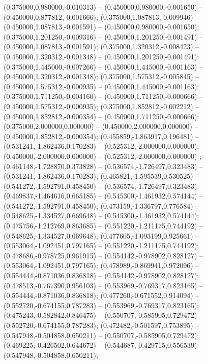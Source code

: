  (0.375000,0.980000,-0.010313) -- (0.450000,0.980000,-0.001650) -- (0.450000,0.877812,-0.001666);
 (0.375000,1.087813,-0.009946) -- (0.450000,1.087813,-0.001591) -- (0.450000,0.980000,-0.001650);
 (0.375000,1.201250,-0.009316) -- (0.450000,1.201250,-0.001491) -- (0.450000,1.087813,-0.001591);
 (0.375000,1.320312,-0.008423) -- (0.450000,1.320312,-0.001348) -- (0.450000,1.201250,-0.001491);
 (0.375000,1.445000,-0.007266) -- (0.450000,1.445000,-0.001163) -- (0.450000,1.320312,-0.001348);
 (0.375000,1.575312,-0.005845) -- (0.450000,1.575312,-0.000935) -- (0.450000,1.445000,-0.001163);
 (0.375000,1.711250,-0.004160) -- (0.450000,1.711250,-0.000666) -- (0.450000,1.575312,-0.000935);
 (0.375000,1.852812,-0.002212) -- (0.450000,1.852812,-0.000354) -- (0.450000,1.711250,-0.000666);
 (0.375000,2.000000,0.000000) -- (0.450000,2.000000,0.000000) -- (0.450000,1.852812,-0.000354);
 (0.455859,-1.863917,0.196481) -- (0.531241,-1.862436,0.170283) -- (0.525312,-2.000000,0.000000);
 (0.450000,-2.000000,0.000000) -- (0.525312,-2.000000,0.000000) ;
 (0.461148,-1.728870,0.373828) -- (0.536574,-1.726497,0.323483) -- (0.531241,-1.862436,0.170283);
 (0.465821,-1.595539,0.530525) -- (0.541272,-1.592791,0.458450) -- (0.536574,-1.726497,0.323483);
 (0.469837,-1.464616,0.665185) -- (0.545300,-1.461932,0.574144) -- (0.541272,-1.592791,0.458450);
 (0.473159,-1.336797,0.776584) -- (0.548625,-1.334527,0.669648) -- (0.545300,-1.461932,0.574144);
 (0.475756,-1.212769,0.863685) -- (0.551220,-1.211175,0.744192) -- (0.548625,-1.334527,0.669648);
 (0.477605,-1.093199,0.925661) -- (0.553064,-1.092451,0.797165) -- (0.551220,-1.211175,0.744192);
 (0.478686,-0.978725,0.961915) -- (0.554142,-0.978902,0.828127) -- (0.553064,-1.092451,0.797165);
 (0.478989,-0.869941,0.972096) -- (0.554444,-0.871036,0.836818) -- (0.554142,-0.978902,0.828127);
 (0.478513,-0.767390,0.956103) -- (0.553969,-0.769317,0.823165) -- (0.554444,-0.871036,0.836818);
 (0.477260,-0.671552,0.914094) -- (0.552720,-0.674155,0.787283) -- (0.553969,-0.769317,0.823165);
 (0.475243,-0.582842,0.846475) -- (0.550707,-0.585905,0.729472) -- (0.552720,-0.674155,0.787283);
 (0.472482,-0.501597,0.753895) -- (0.547948,-0.504858,0.650211) -- (0.550707,-0.585905,0.729472);
 (0.469225,-0.426502,0.644672) -- (0.544687,-0.429715,0.556539) -- (0.547948,-0.504858,0.650211);
